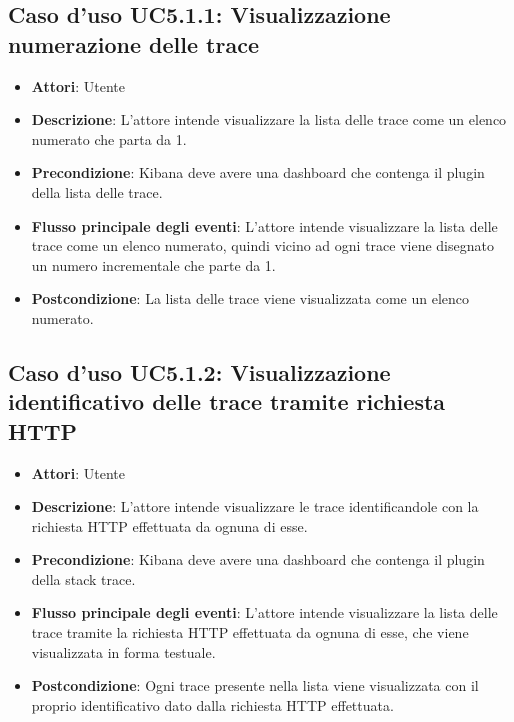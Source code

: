 \subsection{Caso d'uso UC5.1.1: Visualizzazione numerazione delle trace}
\begin{itemize}
	\item \textbf{Attori}: Utente
	\item \textbf{Descrizione}: L'attore intende visualizzare la lista delle trace come un elenco numerato che parta da 1.
	\item \textbf{Precondizione}: Kibana deve avere una dashboard che contenga il plugin della lista delle trace.
	\item \textbf{Flusso principale degli eventi}: L'attore intende visualizzare la lista delle trace come un elenco numerato, quindi vicino ad ogni trace viene disegnato un numero incrementale che parte da 1.
	\item \textbf{Postcondizione}: La lista delle trace viene visualizzata come un elenco numerato.
\end{itemize}
\subsection{Caso d'uso UC5.1.2: Visualizzazione identificativo delle trace tramite richiesta HTTP}
\begin{itemize}
	\item \textbf{Attori}: Utente
	\item \textbf{Descrizione}: L'attore intende visualizzare le trace identificandole con la richiesta HTTP effettuata da ognuna di esse.
	\item \textbf{Precondizione}: Kibana deve avere una dashboard che contenga il plugin della stack trace.
	\item \textbf{Flusso principale degli eventi}: L'attore intende visualizzare la lista delle trace tramite la richiesta HTTP effettuata da ognuna di esse, che viene visualizzata in forma testuale.
	\item \textbf{Postcondizione}: Ogni trace presente nella lista viene visualizzata con il proprio identificativo dato dalla richiesta HTTP effettuata.
\end{itemize}
